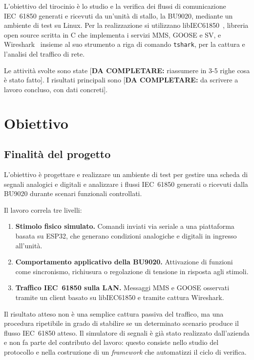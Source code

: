 \documentclass[11pt,a4paper,italian,oneside,openany]{book}
\newcommand{\daf}[1]{{\color{red}[\textbf{DA COMPLETARE:} #1]}}
\begin{document}
L'obiettivo del tirocinio è lo studio e la verifica dei flussi di comunicazione IEC~61850 generati e ricevuti da un'unità di stallo, la BU9020, mediante un ambiente di test su Linux. Per la realizzazione si utilizzano libIEC61850~\cite{libiec61850}, libreria open source scritta in C che implementa i servizi MMS, GOOSE e SV, e Wireshark~\cite{wireshark} insieme al suo strumento a riga di comando \texttt{tshark}, per la cattura e l'analisi del traffico di rete.

Le attività svolte sono state \daf{riassumere in 3-5 righe cosa è stato fatto}. I risultati principali sono \daf{da scrivere a lavoro concluso, con dati concreti}.

\chapter{Obiettivo}\label{cap:obiettivo}
\section{Finalità del progetto}
L'obiettivo è progettare e realizzare un ambiente di test per gestire una scheda di segnali analogici e digitali e analizzare i flussi IEC~61850 generati o ricevuti dalla BU9020 durante scenari funzionali controllati.

Il lavoro correla tre livelli:
\begin{enumerate}
    \item \textbf{Stimolo fisico simulato.} Comandi inviati via seriale a una piattaforma basata su ESP32, che generano condizioni analogiche e digitali in ingresso all'unità.
    \item \textbf{Comportamento applicativo della BU9020.} Attivazione di funzioni come sincronismo, richiusura o regolazione di tensione in risposta agli stimoli.
    \item \textbf{Traffico IEC~61850 sulla LAN.} Messaggi MMS e GOOSE osservati tramite un client basato su libIEC61850 e tramite cattura Wireshark.
\end{enumerate}

Il risultato atteso non è una semplice cattura passiva del traffico, ma una procedura ripetibile in grado di stabilire se un determinato scenario produce il flusso IEC~61850 atteso. Il simulatore di segnali è già stato realizzato dall'azienda e non fa parte del contributo del lavoro: questo consiste nello studio del protocollo e nella costruzione di un \textit{framework} che automatizzi il ciclo di verifica.
\end{document}
